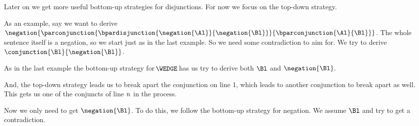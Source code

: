 Later on we get more useful bottom-up strategies for disjunctions. For now we focus on the top-down strategy. 

As an example, say we want to derive $\negation{\parconjunction{\bpardisjunction{\negation{\Al}}{\negation{\Bl}}}{\bparconjunction{\Al}{\Bl}}}$. 
The whole sentence itself is a negation, so we start just as in the last example. 
So we need some contradiction to aim for. 
We try to derive $\conjunction{\Bl}{\negation{\Bl}}$.
\begin{gproof}
\galineNCnd{}{}{}
\galineNCnd{}{$\qquad\vdots$}{}
\galineNCnd{}{}{}
\end{gproof}
As in the last example the bottom-up strategy for $\!\WEDGE\!$ has us try to derive both $\Bl$ and $\negation{\Bl}$.
\begin{gproof}
\galineNCnd{}{}{}
\galineNCnd{}{$\qquad\vdots$}{}
\galineNCnd{}{}{}
\end{gproof}
And, the top-down strategy leads us to break apart the conjunction on line 1, which leads to another conjunction to break apart as well. This gets us one of the conjuncts of line $n$ in the process.
\begin{gproof}
\galineNCnd{}{}{}
\galineNCnd{}{$\qquad\vdots$}{}
\galineNCnd{}{}{}
\end{gproof}
Now we only need to get $\negation{\Bl}$. 
To do this, we follow the bottom-up strategy for negation. 
We assume $\Bl$ and try to get a contradiction.
